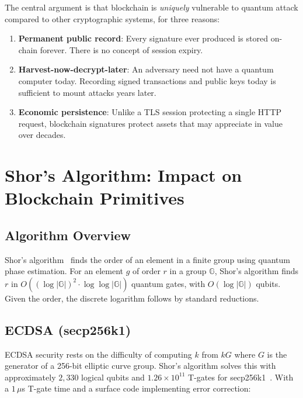 \documentclass[11pt,a4paper]{article}
\begin{document}
The central argument is that blockchain is \emph{uniquely} vulnerable to quantum
attack compared to other cryptographic systems, for three reasons:

\begin{enumerate}[leftmargin=2em]
  \item \textbf{Permanent public record}: Every signature ever produced is stored
        on-chain forever. There is no concept of session expiry.
  \item \textbf{Harvest-now-decrypt-later}: An adversary need not have a quantum
        computer today. Recording signed transactions and public keys today is
        sufficient to mount attacks years later.
  \item \textbf{Economic persistence}: Unlike a TLS session protecting a single
        HTTP request, blockchain signatures protect assets that may appreciate in
        value over decades.
\end{enumerate}

\section{Shor's Algorithm: Impact on Blockchain Primitives}
\label{sec:shor}

\subsection{Algorithm Overview}

Shor's algorithm~\cite{shor1997} finds the order of an element in a finite group
using quantum phase estimation. For an element $g$ of order $r$ in a group
$\mathbb{G}$, Shor's algorithm finds $r$ in $O((\log |\mathbb{G}|)^2 \cdot \log\log |\mathbb{G}|)$
quantum gates, with $O(\log |\mathbb{G}|)$ qubits. Given the order, the discrete
logarithm follows by standard reductions.

\subsection{ECDSA (secp256k1)}

ECDSA security rests on the difficulty of computing $k$ from $kG$ where $G$ is the
generator of a 256-bit elliptic curve group. Shor's algorithm solves this with
approximately $2{,}330$ logical qubits and $1.26 \times 10^{11}$ T-gates for
secp256k1~\cite{roetteler2017quantum}. With a $1\,\mu$s T-gate time and a
surface code implementing error correction:
\end{document}
